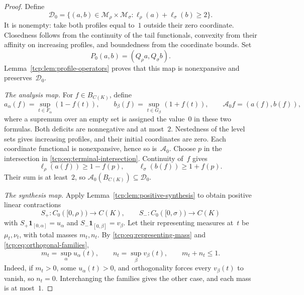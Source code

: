 \documentclass[preprint,12pt,nopreprintline]{elsarticle}
\theoremstyle{definition}
\theoremstyle{remark}
\numberwithin{equation}{section}
\begin{document}
\begin{proof}
Define
\begin{equation}
 \mathcal D_0=
 \{(a,b)\in\mathcal M_\rho\times\mathcal M_\sigma:
       \ell_\rho(a)+\ell_\sigma(b)\ge2\}.
 \label{tcp:eq:profile-domain}
\end{equation}
It is nonempty: take both profiles equal to~$1$ outside their zero coordinate. Closedness follows from the continuity of the tail
functionals, convexity from their affinity on increasing profiles, and boundedness from the coordinate bounds. Set
\begin{equation}
 P_0(a,b)=(Q_\rho a,Q_\sigma b).
 \label{tcp:eq:product-propagator}
\end{equation}
Lemma~\ref{tcp:lem:profile-operators} proves that this map is nonexpansive and preserves~$\mathcal D_0$.

\smallskip\noindent
\emph{The analysis map.} For $f\in B_{C(K)}$, define
\begin{equation}
 a_\alpha(f)=\sup_{t\in F_\alpha}(1-f(t)),\qquad
 b_\beta(f)=\sup_{t\in G_\beta}(1+f(t)),\qquad
 \mathcal A_0f=(a(f),b(f)),
 \label{tcp:eq:analysis}
\end{equation}
where a supremum over an empty set is assigned the value~$0$ in these two formulas. Both deficits are nonnegative and at most~$2$.
Nestedness of the level sets gives increasing profiles, and their initial coordinates are zero. Each coordinate functional is
nonexpansive, hence so is~$\mathcal A_0$. Choose $p$ in the intersection in \eqref{tcp:eq:terminal-intersection}. Continuity of~$f$ gives
\[
 \ell_\rho(a(f))\ge1-f(p),\qquad
 \ell_\sigma(b(f))\ge1+f(p).
\]
Their sum is at least~$2$, so $\mathcal A_0(B_{C(K)})\subseteq\mathcal D_0$.

\smallskip\noindent
\emph{The synthesis map.} Apply Lemma~\ref{tcp:lem:positive-synthesis} to obtain positive linear contractions
\[
 S_+:C_0([0,\rho))\to C(K),\qquad
 S_-:C_0([0,\sigma))\to C(K)
\]
with $S_+\mathbf1_{[0,\alpha]}=u_\alpha$ and $S_-\mathbf1_{[0,\beta]}=v_\beta$. Let their representing measures
at~$t$ be $\mu_t,\nu_t$, with total masses $m_t,n_t$. By \eqref{tcp:eq:representing-mass} and
\eqref{tcp:eq:orthogonal-families},
\begin{equation}
 m_t=\sup_\alpha u_\alpha(t),\qquad
 n_t=\sup_\beta v_\beta(t),\qquad m_t+n_t\le1.
 \label{tcp:eq:mass-bound}
\end{equation}
Indeed, if $m_t>0$, some $u_\alpha(t)>0$, and orthogonality forces every $v_\beta(t)$ to vanish, so $n_t=0$. Interchanging the families gives the other case, and each mass is at most~$1$.


\end{proof}
\end{document}
